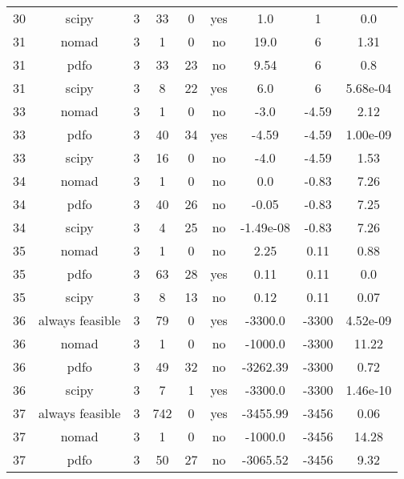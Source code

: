 \begin{scriptsize}
\begin{center}
\begin{longtable}{ccccccccc}
 30 &           scipy &  3 &     33 &      0 &     yes &         1.0 &           1 &      0.0\\
 31 &           nomad &  3 &      1 &      0 &      no &        19.0 &           6 &     1.31\\
 31 &            pdfo &  3 &     33 &     23 &      no &        9.54 &           6 &      0.8\\
 31 &           scipy &  3 &      8 &     22 &     yes &         6.0 &           6 & 5.68e-04\\
 33 &           nomad &  3 &      1 &      0 &      no &        -3.0 &       -4.59 &     2.12\\
 33 &            pdfo &  3 &     40 &     34 &     yes &       -4.59 &       -4.59 & 1.00e-09\\
 33 &           scipy &  3 &     16 &      0 &      no &        -4.0 &       -4.59 &     1.53\\
 34 &           nomad &  3 &      1 &      0 &      no &         0.0 &       -0.83 &     7.26\\
 34 &            pdfo &  3 &     40 &     26 &      no &       -0.05 &       -0.83 &     7.25\\
 34 &           scipy &  3 &      4 &     25 &      no &   -1.49e-08 &       -0.83 &     7.26\\
 35 &           nomad &  3 &      1 &      0 &      no &        2.25 &        0.11 &     0.88\\
 35 &            pdfo &  3 &     63 &     28 &     yes &        0.11 &        0.11 &      0.0\\
 35 &           scipy &  3 &      8 &     13 &      no &        0.12 &        0.11 &     0.07\\
 36 & always feasible &  3 &     79 &      0 &     yes &     -3300.0 &       -3300 & 4.52e-09\\
 36 &           nomad &  3 &      1 &      0 &      no &     -1000.0 &       -3300 &    11.22\\
 36 &            pdfo &  3 &     49 &     32 &      no &    -3262.39 &       -3300 &     0.72\\
 36 &           scipy &  3 &      7 &      1 &     yes &     -3300.0 &       -3300 & 1.46e-10\\
 37 & always feasible &  3 &    742 &      0 &     yes &    -3455.99 &       -3456 &     0.06\\
 37 &           nomad &  3 &      1 &      0 &      no &     -1000.0 &       -3456 &    14.28\\
 37 &            pdfo &  3 &     50 &     27 &      no &    -3065.52 &       -3456 &     9.32\\

\end{longtable}
\end{center}
\end{scriptsize}
